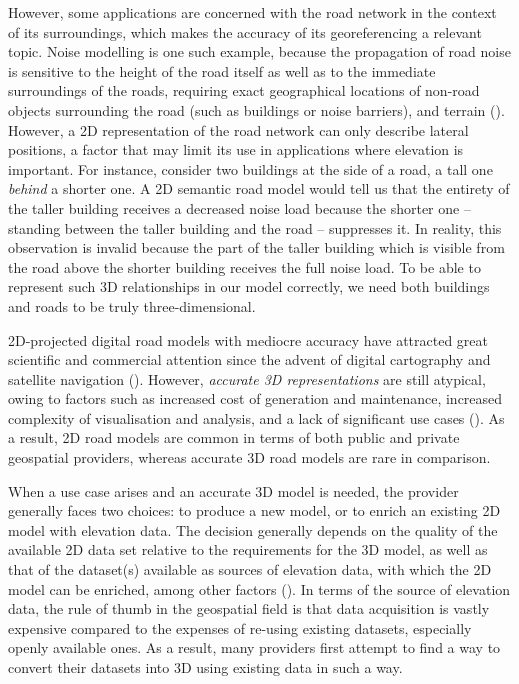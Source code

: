 However, some applications are concerned with the road network in the context of its surroundings, which makes the accuracy of its georeferencing a relevant topic. Noise modelling is one such example, because the propagation of road noise is sensitive to the height of the road itself as well as to the immediate surroundings of the roads, requiring exact geographical locations of non-road objects surrounding the road (such as buildings or noise barriers), and terrain (\cite{ishiyama_etal_1991, bennett_1997, guarnaccia_quartieri_2012}). However, a 2D representation of the road network can only describe lateral positions, a factor that may limit its use in applications where elevation is important. For instance, consider two buildings at the side of a road, a tall one \textit{behind} a shorter one. A 2D semantic road model would tell us that the entirety of the taller building receives a decreased noise load because the shorter one – standing between the taller building and the road – suppresses it. In reality, this observation is invalid because the part of the taller building which is visible from the road above the shorter building receives the full noise load. To be able to represent such 3D relationships in our model correctly, we need both buildings and roads to be truly three-dimensional.

2D-projected digital road models with mediocre accuracy have attracted great scientific and commercial attention since the advent of digital cartography and satellite navigation (\cite{taylor_etal_2001, fouque_bonnifait_2008, yue_etal_2008, chen_hsu_2020}). However, \textit{accurate 3D representations} are still atypical, owing to factors such as increased cost of generation and maintenance, increased complexity of visualisation and analysis, and a lack of significant use cases (\cite{zhu_li_2007, wang_etal_2014}). As a result, 2D road models are common in terms of both public and private geospatial providers, whereas accurate 3D road models are rare in comparison.

When a use case arises and an accurate 3D model is needed, the provider generally faces two choices: to produce a new model, or to enrich an existing 2D model with elevation data. The decision generally depends on the quality of the available 2D data set relative to the requirements for the 3D model, as well as that of the dataset(s) available as sources of elevation data, with which the 2D model can be enriched, among other factors (\cite{zhu_li_2007, zhu_li_2008, wang_etal_2014}). In terms of the source of elevation data, the rule of thumb in the geospatial field is that data acquisition is vastly expensive compared to the expenses of re-using existing datasets, especially openly available ones. As a result, many providers first attempt to find a way to convert their datasets into 3D using existing data in such a way.

